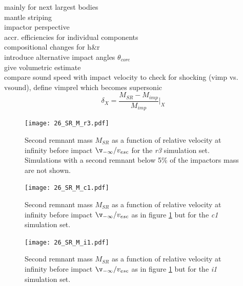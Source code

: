 mainly for next largest bodies\\
mantle striping\\
impactor perspective\\
accr. efficiencies for individual components \\
compositional changes for h\&r \\
introduce alternative impact angles $\theta_{core}$ \\
give volumetric estimate \\
compare sound speed with impact velocity to check for shocking (vimp vs. vsound), define vimprel which becomes supersonic \\

\begin{equation}
\delta_X = \frac{M_{SR} - M_{imp}}{M_{imp}} \Bigg|_{X}
\end{equation}

\begin{landscape}
\begin{figure}[htbp]
\begin{center}
\texttt{[image: 26\_SR\_M\_r3.pdf]}
\caption{Second remnant mass $M_{SR}$ as a function of relative velocity at infinity before impact $\v_{-\infty} / \vesc$ for the \emph{r3} simulation set. Simulations with a second remnant below 5\% of the impactors mass are not shown.}
\label{ch03_fig26a}
\end{center}
\end{figure}

\begin{figure}[htbp]
\begin{center}
\texttt{[image: 26\_SR\_M\_c1.pdf]}
\caption{Second remnant mass $M_{SR}$ as a function of relative velocity at infinity before impact $\v_{-\infty} / \vesc$ as in figure \ref{ch03_fig26a} but for the \emph{c1} simulation set.}
\label{ch03_fig26b}
\end{center}
\end{figure}

\begin{figure}[htbp]
\begin{center}
\texttt{[image: 26\_SR\_M\_i1.pdf]}
\caption{Second remnant mass $M_{SR}$ as a function of relative velocity at infinity before impact $\v_{-\infty} / \vesc$ as in figure \ref{ch03_fig26a} but for the \emph{i1} simulation set.}
\label{ch03_fig26c}
\end{center}
\end{figure}
\end{landscape}


